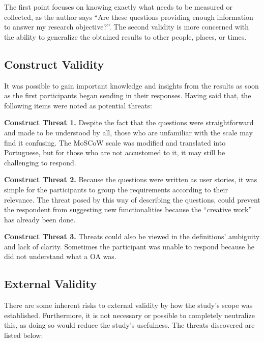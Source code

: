 The first point focuses on knowing exactly what needs to be measured or collected, as the author says ``Are these questions providing enough information to answer my research objective?''. The second validity is more concerned with the ability to generalize the obtained results to other people, places, or times.

\subsection{Construct Validity}\label{sec:survey-construct-validity}

It was possible to gain important knowledge and insights from the results as soon as the first participants began sending in their responses. Having said that, the following items were noted as potential threats:

\begin{description}
  \item \textbf{Construct Threat 1.} Despite the fact that the questions were straightforward and made to be understood by all, those who are unfamiliar with the scale may find it confusing. The MoSCoW scale was modified and translated into Portuguese, but for those who are not accustomed to it, it may still be challenging to respond.\label{ct:1}
  \item \textbf{Construct Threat 2.} Because the questions were written as user stories, it was simple for the participants to group the requirements according to their relevance. The threat posed by this way of describing the questions, could prevent the respondent from suggesting new functionalities because the ``creative work'' has already been done.\label{ct:2}
  \item \textbf{Construct Threat 3.} Threats could also be viewed in the definitions' ambiguity and lack of clarity. Sometimes the participant was unable to respond because he did not understand what a \ac{OA} was.\label{ct:3}
\end{description}

\subsection{External Validity}\label{sec:survey-external-validity}

There are some inherent risks to external validity by how the study's scope was established.
Furthermore, it is not necessary or possible to completely neutralize this, as doing so would reduce the study's usefulness. The threats discovered are listed below:

